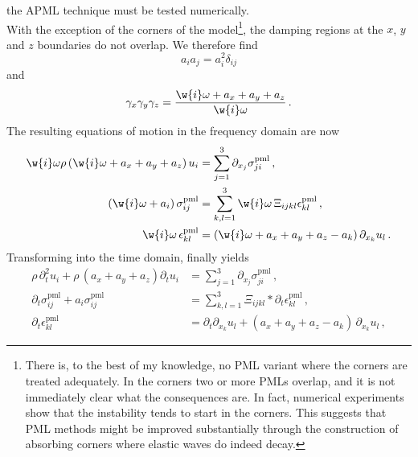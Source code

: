 the APML
technique must be tested numerically.\\[5pt]
With the exception of the corners of the
model\footnote{\textsf{There is, to the best of my knowledge, no PML
variant where the corners are treated adequately. In the corners two
or more PMLs overlap, and it is not immediately clear what the
consequences are. In fact, numerical experiments show that the
instability tends to start in the corners. This suggests that PML
methods might be improved substantially through the construction of
absorbing corners where elastic waves do indeed decay.}}, the
damping regions at the $x$, $y$ and $z$ boundaries do not overlap.
We therefore find
\begin{equation}\label{E:apml023}
a_i a_j = a_i^2 \delta_{ij}
\end{equation}
and
\begin{equation}\label{E:apml024}
\gamma_x \gamma_y \gamma_z = \frac{\w{i}\omega + a_x + a_y +
a_z}{\w{i}\omega}\,.
\end{equation}
The resulting equations of motion in the frequency domain are now
\begin{subequations}\label{E:apml025}
\begin{align}
\w{i}\omega\rho\,(\w{i}\omega + a_x + a_y + a_z)\, u_i &=
\sum_{j=1}^{3} \partial_{x_j}
\sigma_{ji}^{\text{pml}}\,,\label{E:apml025a}\\
(\w{i}\omega + a_i)\,\sigma_{ij}^{\text{pml}} &= \sum_{k,l=1}^{3}
\w{i}\omega\,\Xi_{ijkl} \epsilon_{kl}^{\text{pml}}\,,\label{E:apml025b}\\
\w{i}\omega\,\epsilon_{kl}^{\text{pml}} &=(\w{i}\omega + a_x + a_y +
a_z - a_k)\,\partial_{x_k} u_l\,.\label{E:apml025c}
\end{align}
\end{subequations}
Transforming into the time domain, finally yields
\begin{subequations}\label{E:apml026}
\begin{align}
\rho\,\partial_t^2 u_i + \rho\,(a_x+a_y+a_z) \partial_t u_i &=
\sum_{j=1}^{3} \partial_{x_j}
\sigma_{ji}^{\text{pml}}\,,\label{E:apml026a}\\
\partial_t \sigma_{ij}^{\text{pml}} + a_i \sigma_{ij}^{\text{pml}}
&= \sum_{k,l=1}^{3} \Xi_{ijkl}
*\partial_t{\epsilon}_{kl}^{\text{pml}}\,,\label{E:apml026b}\\
\partial_t{\epsilon}_{kl}^{\text{pml}} &= \partial_t \partial_{x_k} u_l +
(a_x+a_y+a_z-a_k)\,\partial_{x_k} u_l\,,\label{E:apml026c}
\end{align}
\end{subequations}
